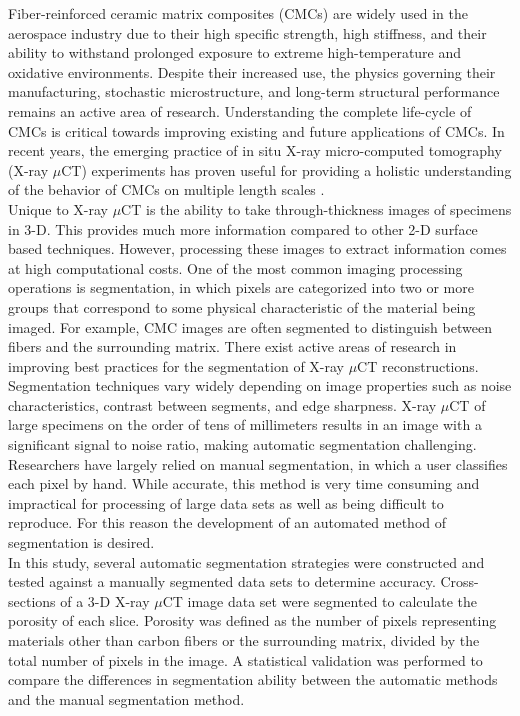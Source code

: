 \documentclass[11pt, twocolumn]{IEEEtran}
\begin{document}
Fiber-reinforced ceramic matrix composites (CMCs) are widely used in the aerospace industry due to their high specific strength, high stiffness, and their ability to withstand prolonged exposure to extreme high-temperature and oxidative environments. Despite their increased use, the physics governing their manufacturing, stochastic microstructure, and long-term structural performance remains an active area of research. Understanding the complete life-cycle of CMCs is critical towards improving  existing and future applications of CMCs. In recent years, the emerging practice of in situ X-ray micro-computed tomography (X-ray $\mu$CT) experiments has proven useful for providing a holistic understanding of the behavior of CMCs on multiple length scales \cite{Larson,Bale,Bale2,Cox,Haboub,Marshall}.\\
Unique to X-ray $\mu$CT is the ability to take through-thickness images of specimens in 3-D. This provides much more information compared to other 2-D surface based techniques. However, processing these images to extract information comes at high computational costs. One of the most common imaging processing operations is segmentation, in which pixels are categorized into two or more groups that correspond to some physical characteristic of the material being imaged. For example, CMC images are often segmented to distinguish between fibers and the surrounding matrix. There exist active areas of research in improving best practices for the segmentation of X-ray $\mu$CT reconstructions. Segmentation techniques vary widely depending on image properties such as noise characteristics, contrast between segments, and edge sharpness. X-ray $\mu$CT of large specimens on the order of tens of millimeters results in an image with a significant signal to noise ratio, making automatic segmentation challenging. Researchers have largely relied on manual segmentation, in which a user classifies each pixel by hand. While accurate, this method is very time consuming and impractical for processing of large data sets as well as being difficult to reproduce. For this reason the development of an automated method of segmentation is desired.\\
In this study, several automatic segmentation strategies were constructed and tested against a manually segmented data sets to determine accuracy. Cross-sections of a 3-D X-ray $\mu$CT image data set were segmented to calculate the porosity of each slice. Porosity was defined as the number of pixels representing materials other than carbon fibers or the surrounding matrix, divided by the total number of pixels in the image. A statistical validation was performed to compare the differences in segmentation ability between the automatic methods and the manual segmentation method.
\end{document}
